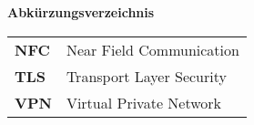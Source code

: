 %
%
% 
% 
% 

\begin{center}
{\Large\bfseries Abkürzungsverzeichnis}
\end{center}

\begin{table*}[htbp]
		\begin{tabular}{ll}
		     \textbf{NFC} & Near Field Communication \\
 		     \textbf{TLS}  & Transport Layer Security \\
 		 	 \textbf{VPN} & Virtual Private Network \\
		\end{tabular}
\end{table*}